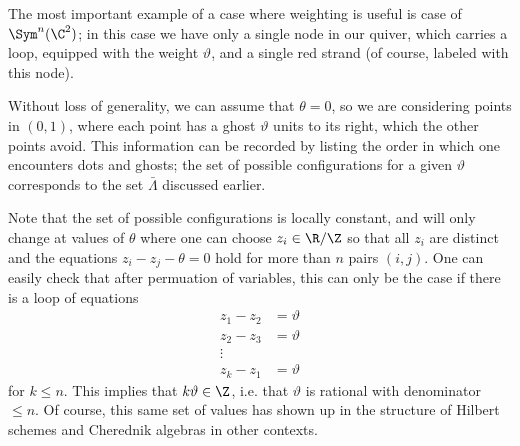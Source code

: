 The most important example of a case where weighting is useful is case of $\Sym^n(\C^2)$; in this case we have only a single node in our quiver, which carries a loop, equipped with the weight $\vartheta$, and a single red strand (of course, labeled with this node). 

Without loss of generality, we can assume that $\theta=0$, so we are considering points in $(0,1)$, where each point has a ghost $\vartheta$ units to its right, which the other points avoid.  This information can be recorded by listing the order in which one encounters dots and ghosts; the set of possible configurations for a given $\vartheta$ corresponds to the set $\bar \Lambda$ discussed earlier.  

Note that the set of possible configurations is locally constant, and will only change at values of $\theta$ where one can choose $z_i\in \R/\Z$ so that all $z_i$ are distinct and the equations $z_i-z_j-\theta=0$ hold for more than $n$ pairs $(i,j)$.  One can easily check that after permuation of variables, this can only be the case if there is a loop of equations 
\begin{align*}
    z_1-z_2&=\vartheta\\
    z_2-z_3&=\vartheta\\
    \vdots&\\
    z_k-z_1&=\vartheta
\end{align*}
for $k\leq n$.  This implies that $k\vartheta\in \Z$, i.e. that $\vartheta$ is rational with denominator $\leq n$.  Of course, this same set of values has shown up in the structure of Hilbert schemes and Cherednik algebras in other contexts.  




